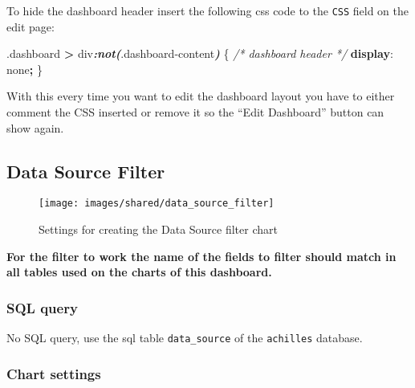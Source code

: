 \documentclass[
]{book}
\newenvironment{Shaded}{\begin{snugshade}}{\end{snugshade}}
\newcommand{\CommentTok}[1]{\textcolor[rgb]{0.56,0.35,0.01}{\textit{#1}}}
\newcommand{\DecValTok}[1]{\textcolor[rgb]{0.00,0.00,0.81}{#1}}
\newcommand{\FunctionTok}[1]{\textcolor[rgb]{0.00,0.00,0.00}{#1}}
\newcommand{\InformationTok}[1]{\textcolor[rgb]{0.56,0.35,0.01}{\textbf{\textit{#1}}}}
\newcommand{\KeywordTok}[1]{\textcolor[rgb]{0.13,0.29,0.53}{\textbf{#1}}}
\newcommand{\NormalTok}[1]{#1}
\newcommand{\OperatorTok}[1]{\textcolor[rgb]{0.81,0.36,0.00}{\textbf{#1}}}
\begin{document}
To hide the dashboard header insert the following css code to the \texttt{CSS} field on the edit page:

\begin{Shaded}
\begin{Highlighting}[]
\FunctionTok{.dashboard} \OperatorTok{\textgreater{}}\NormalTok{ div}\InformationTok{:not(}\FunctionTok{.dashboard{-}content}\InformationTok{)}\NormalTok{ \{  }\CommentTok{/* dashboard header */}
  \KeywordTok{display}\NormalTok{: }\DecValTok{none}\OperatorTok{;}
\NormalTok{\}}
\end{Highlighting}
\end{Shaded}

With this every time you want to edit the dashboard layout you have to either comment the CSS inserted
or remove it so the ``Edit Dashboard'' button can show again.

\hypertarget{data-source-filter}{%
\subsection*{Data Source Filter}\label{data-source-filter}}

\begin{figure}
\texttt{[image: images/shared/data\_source\_filter]} \caption{Settings for creating the Data Source filter chart}\label{fig:dataSourceFilter}
\end{figure}

\textbf{For the filter to work the name of the fields to filter should match in all tables used on the charts of this dashboard.}

\hypertarget{sql-query}{%
\subsubsection*{SQL query}\label{sql-query}}

No SQL query, use the sql table \texttt{data\_source} of the \texttt{achilles} database.

\hypertarget{chart-settings}{%
\subsubsection*{Chart settings}\label{chart-settings}}
\end{document}
